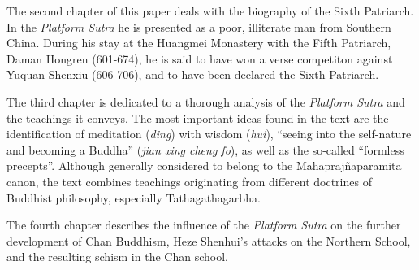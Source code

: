 The second chapter of this paper deals with the biography of the Sixth Patriarch.
In the \textit{Platform Sutra} he is presented as a poor, illiterate man from Southern China.
During his stay at the Huangmei Monastery with the Fifth Patriarch, Daman Hongren (601-674), he is said to have won a verse competiton against Yuquan Shenxiu (606-706), and to have been declared the Sixth Patriarch.

The third chapter is dedicated to a thorough analysis of the \textit{Platform Sutra} and the teachings it conveys.
The most important ideas found in the text are the identification of meditation (\textit{ding}) with wisdom (\textit{hui}), ``seeing into the self-nature and becoming a Buddha'' (\textit{jian xing cheng fo}), as well as the so-called ``formless precepts''.
Although generally considered to belong to the Mahaprajñaparamita canon, the text combines teachings originating from different doctrines of Buddhist philosophy, especially Tathagathagarbha.

The fourth chapter describes the influence of the \textit{Platform Sutra} on the further development of Chan Buddhism, Heze Shenhui's attacks on the Northern School, and the resulting schism in the Chan school.

